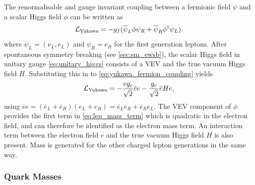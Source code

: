 The renormalisable and gauge invariant coupling between a fermionic field $\psi$ and a scalar Higgs field $\phi$ can be written as 
%
\begin{equation}\label{eq:yukawa_fermion_coupling}
  \mathcal{L}_{\textnormal{Yukawa}} = 
  - g_f (\overline{\psi}_L \phi \psi_R + \overline{\psi}_R \phi^\dagger \psi_L) .
\end{equation}
%
where $\psi_L = (\nu_L, e_L)$ and $\psi_R = e_R$ for the first generation leptons.
After spontaneous symmetry breaking (see \cref{sec:sm_ewsb}), the scalar Higgs field in unitary gauge \cref{eq:unitary_higgs} consists of a VEV and the true vacuum Higgs field $H$.
Substituting this in to \cref{eq:yukawa_fermion_coupling} yields
%
\begin{equation}\label{eq:lep_mass_term}
  \mathcal{L}_{\textnormal{Yukawa}} = 
  - \frac{v g_e}{\sqrt{2}} \overline{e} e
  - \frac{g_e}{\sqrt{2}} \overline{e} H e ,
\end{equation}
%
using $\overline{e} e = (\overline{e}_L + \overline{e}_R)(e_L + e_R) = \overline{e}_L e_R + \overline{e}_R e_L$.
The VEV component of $\phi$ provides the first term in \cref{eq:lep_mass_term} which is quadratic in the electron field, and can therefore be identified as the electron mass term.
An interaction term between the electron field $e$ and the true vacuum Higgs field $H$ is also present.
Mass is generated for the other charged lepton generations in the same way.

\subsubsection{Quark Masses}

